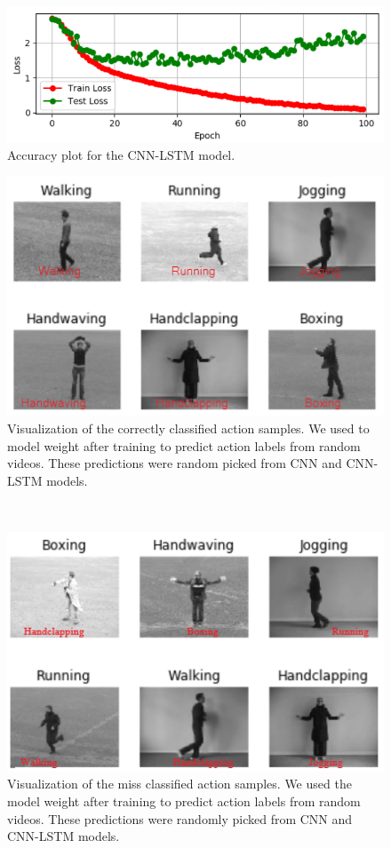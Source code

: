 \documentclass{vldb}
\begin{document}
\begin{figure}[ht]
\begin{minipage}[b]{0.5\linewidth}
    \centering
    \includegraphics[width=1\linewidth]{photo/cnnlstmloss.PNG}
    \caption{Accuracy plot for the CNN-LSTM model.} 
    \vspace{4ex}
  \end{minipage} 
\end{figure}\label{fig:fig7868} 



\begin{figure}[ht]
\centering
\includegraphics[width=0.8\columnwidth]{photo/classified.png}
\caption{Visualization of the correctly classified action samples. We used to model weight after training to predict action labels from random videos. These predictions were random picked from CNN and CNN-LSTM models.}
\label{fig:classified}
\end{figure}\\

\begin{figure}[h]
\centering
\includegraphics[width=0.8\columnwidth]{photo/missclassified.png}
\caption{Visualization of the miss classified action samples. We used the model weight after training to predict action labels from random videos. These predictions were randomly  picked from CNN and CNN-LSTM models.}
\label{fig:missclassified}
\end{figure}
\end{document}
